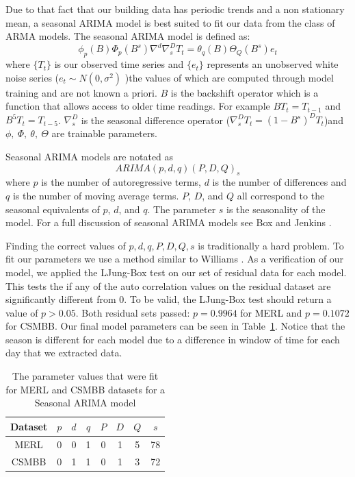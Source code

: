 \documentclass{acm_proc_article-sp}
\begin{document}
Due to that fact that our building data has periodic trends and a non stationary mean, a seasonal ARIMA model is best suited to fit our data from the class of ARMA models.  The seasonal ARIMA model is defined as:
\begin{equation}
\label{eq:sarima}
\phi_{p}(B)\Phi_{p}(B^{s})\nabla^{d}\nabla^{D}_{s}T_{t} = \theta_{q}(B)\Theta_{Q}(B^{s})e_{t}
\end{equation}
\noindent
where $\{T_{t}\}$ is our observed time series and $\{e_t\}$ represents an unobserved white noise series ($e_{t} \sim N(0, \sigma^{2})$ )the values of which are computed through model training and are not known a priori.  $B$ is the backshift operator which is a function that allows access to older time readings.  For example $BT_{t} = T_{t-1}$ and $B^{5}T_{t} = T_{t-5}$.  $\nabla^{D}_{s}$ is the seasonal difference operator ($\nabla^{D}_{s}T_{t} = (1 - B^{s})^{D}T_{t}$)and $\phi,\  \Phi,\  \theta,\ \Theta$ are trainable parameters.  

Seasonal ARIMA models are notated as
\begin{equation}
ARIMA(p,d,q)(P,D,Q)_{s}
\end{equation}
where $p$ is the number of autoregressive terms, $d$ is the number of differences and $q$ is the number of moving average terms.  $P$, $D$, and $Q$ all correspond to the seasonal equivalents of $p$, $d$, and $q$.  The parameter $s$ is the seasonality of the model.  For a full discussion of seasonal ARIMA models see Box and Jenkins \cite{Box2008}.

Finding the correct values of $p, d, q, P, D, Q, s$ is traditionally a hard problem.  To fit our parameters we use a method similar to Williams \cite{Williams2003}.  As a verification of our model, we applied the LJung-Box test \cite{Ljung1978} on our set of residual data for each model.  This tests the if any of the auto correlation values on the residual dataset are significantly different from 0.  To be valid, the LJung-Box test should return a value of $p > 0.05$.  Both residual sets passed: $p = 0.9964$ for MERL and $p = 0.1072$ for CSMBB.  Our final model parameters can be seen in Table~\ref{fig:sarimatab}.  Notice that the season is different for each model due to a difference in window of time for each day that we extracted data.

\begin{table}[t]
\centering
\caption{The parameter values that were fit for MERL and CSMBB datasets for a Seasonal ARIMA model}
\begin{tabular}{|c|c|c|c|c|c|c|c|} \hline
Dataset & $p$ & $d$ & $q$ & $P$ & $D$ & $Q$ & $s$\\ \hline
MERL & 0 & 0 & 1 & 0 & 1 & 5 & 78\\ \hline
CSMBB & 0 & 1 & 1 & 0 & 1 & 3 & 72\\ \hline
\end{tabular}
\label{fig:sarimatab}
\end{table}
\end{document}
